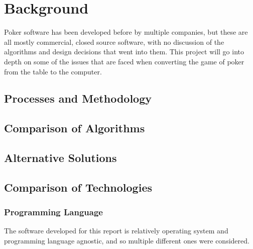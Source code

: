 \section{Background}
Poker software has been developed before by multiple companies, but these
are all mostly commercial, closed source software, with no discussion of the
algorithms and design decisions that went into them. This project will go
into depth on some of the issues that are faced when converting the game of
poker from the table to the computer.

\subsection{Processes and Methodology}

\subsection{Comparison of Algorithms}

\subsection{Alternative Solutions}

\subsection{Comparison of Technologies}

\subsubsection{Programming Language}

The software developed for this report is relatively operating system and
programming language agnostic, and so multiple different ones were considered.

